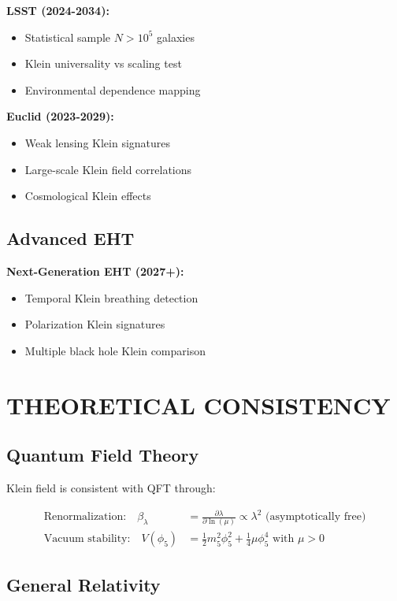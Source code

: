 \documentclass[12pt,a4paper]{article}
\begin{document}
\textbf{LSST (2024-2034):}
\begin{itemize}
\item Statistical sample $N > 10^5$ galaxies
\item Klein universality vs scaling test
\item Environmental dependence mapping
\end{itemize}

\textbf{Euclid (2023-2029):}
\begin{itemize}
\item Weak lensing Klein signatures
\item Large-scale Klein field correlations
\item Cosmological Klein effects
\end{itemize}

\subsection{Advanced EHT}

\textbf{Next-Generation EHT (2027+):}
\begin{itemize}
\item Temporal Klein breathing detection
\item Polarization Klein signatures
\item Multiple black hole Klein comparison
\end{itemize}

\section{THEORETICAL CONSISTENCY}

\subsection{Quantum Field Theory}

Klein field is consistent with QFT through:

\begin{align}
\text{Renormalization:} \quad \beta_\lambda &= \frac{\partial\lambda}{\partial\ln(\mu)} \propto \lambda^2 \text{ (asymptotically free)}\\
\text{Vacuum stability:} \quad V(\phi_5) &= \frac{1}{2}m_5^2\phi_5^2 + \frac{1}{4}\mu\phi_5^4 \text{ with } \mu > 0
\end{align}

\subsection{General Relativity}
\end{document}

